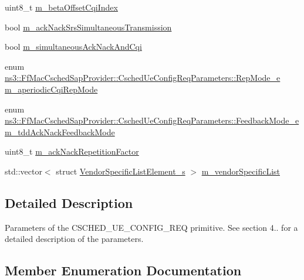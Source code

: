 \begin{DoxyCompactItemize}
uint8\+\_\+t \hyperlink{structns3_1_1FfMacCschedSapProvider_1_1CschedUeConfigReqParameters_a0d400699a3812b70c8468d85111a0ac1}{m\+\_\+beta\+Offset\+Cqi\+Index}
\item 
bool \hyperlink{structns3_1_1FfMacCschedSapProvider_1_1CschedUeConfigReqParameters_aa86143e8fd34a5fe66081140d1932ddc}{m\+\_\+ack\+Nack\+Srs\+Simultaneous\+Transmission}
\item 
bool \hyperlink{structns3_1_1FfMacCschedSapProvider_1_1CschedUeConfigReqParameters_a23e9ebbc9c67b4198899b7148e287c9d}{m\+\_\+simultaneous\+Ack\+Nack\+And\+Cqi}
\item 
enum \hyperlink{structns3_1_1FfMacCschedSapProvider_1_1CschedUeConfigReqParameters_a12b8568a1fac7af4def93058e0e19e5f}{ns3\+::\+Ff\+Mac\+Csched\+Sap\+Provider\+::\+Csched\+Ue\+Config\+Req\+Parameters\+::\+Rep\+Mode\+\_\+e} \hyperlink{structns3_1_1FfMacCschedSapProvider_1_1CschedUeConfigReqParameters_a10fb758f8e6c05affaa2048b57e594d7}{m\+\_\+aperiodic\+Cqi\+Rep\+Mode}
\item 
enum \hyperlink{structns3_1_1FfMacCschedSapProvider_1_1CschedUeConfigReqParameters_a0cc36576e2804f64c3803280abd744b2}{ns3\+::\+Ff\+Mac\+Csched\+Sap\+Provider\+::\+Csched\+Ue\+Config\+Req\+Parameters\+::\+Feedback\+Mode\+\_\+e} \hyperlink{structns3_1_1FfMacCschedSapProvider_1_1CschedUeConfigReqParameters_a4c3a2167583c7feaa37057b2ba70c2bf}{m\+\_\+tdd\+Ack\+Nack\+Feedback\+Mode}
\item 
uint8\+\_\+t \hyperlink{structns3_1_1FfMacCschedSapProvider_1_1CschedUeConfigReqParameters_a2d3747fc685f74c2286d62bc34fa5e21}{m\+\_\+ack\+Nack\+Repetition\+Factor}
\item 
std\+::vector$<$ struct \hyperlink{structns3_1_1VendorSpecificListElement__s}{Vendor\+Specific\+List\+Element\+\_\+s} $>$ \hyperlink{structns3_1_1FfMacCschedSapProvider_1_1CschedUeConfigReqParameters_a9a9448cba2dad5527efc4db1d6f43c6d}{m\+\_\+vendor\+Specific\+List}
\end{DoxyCompactItemize}


\subsection{Detailed Description}
Parameters of the C\+S\+C\+H\+E\+D\+\_\+\+U\+E\+\_\+\+C\+O\+N\+F\+I\+G\+\_\+\+R\+EQ primitive. See section 4.. for a detailed description of the parameters. 

\subsection{Member Enumeration Documentation}
